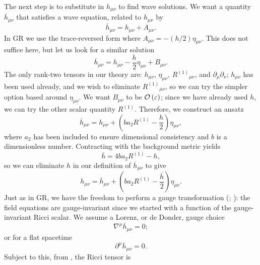 The next step is to substitute in $h_{\mu\nu}$ to find wave solutions. We want a quantity $\overline{h}_{\mu\nu}$ that satisfies a wave equation, related to $h_{\mu\nu}$ by
\begin{equation}
\overline{h}_{\mu\nu} = h_{\mu\nu} + A_{\mu\nu}.
\end{equation}
In GR we use the trace-reversed form where $A_{\mu\nu} = -(h/2)\eta_{\mu\nu}$. This does not suffice here, but let us look for a similar solution
\begin{equation}
\overline{h}_{\mu\nu} = h_{\mu\nu} - \dfrac{h}{2}\eta_{\mu\nu} + B_{\mu\nu}.
\end{equation}
The only rank-two tensors in our theory are: $h_{\mu\nu}$, $\eta_{\mu\nu}$, ${R^{(1)}}_{\mu\nu}$, and $\partial_\mu\partial_\nu$; $h_{\mu\nu}$ has been used already, and we wish to eliminate ${R^{(1)}}_{\mu\nu}$, so we can try the simpler option based around $\eta_{\mu\nu}$. We want $B_{\mu\nu}$ to be $\mathcal{O}\left({\varepsilon}\right)$; since we have already used $h$, we can try the other scalar quantity $R^{(1)}$. Therefore, we construct an ansatz
\begin{equation}
\overline{h}_{\mu\nu} = h_{\mu\nu} + \left(b a_2 R^{(1)} - \dfrac{h}{2}\right)\eta_{\mu\nu},
\label{eq:Ansatz}
\end{equation}
where $a_2$ has been included to ensure dimensional consistency and $b$ is a dimensionless number. Contracting with the background metric yields
\begin{equation}
\overline{h} = 4b a_2 R^{(1)} - h,
\label{eq:h_trace}
\end{equation}
so we can eliminate $h$ in our definition of $\overline{h}_{\mu\nu}$ to give
\begin{equation}
h_{\mu\nu} = \overline{h}_{\mu\nu} + \left(b a_2 R^{(1)} -\dfrac{\overline{h}}{2}\right)\eta_{\mu\nu}.
\end{equation}
Just as in GR, we have the freedom to perform a gauge transformation (\citealt[box 18.2]{Misner1973}; \citealt[section 17.1]{Hobson2006}): the field equations are gauge-invariant since we started with a function of the gauge-invariant Ricci scalar. We assume a Lorenz, or de Donder, gauge choice
\begin{equation}
\nabla^\mu \overline{h}_{\mu\nu} = 0;
\end{equation}
or for a flat spacetime
\begin{equation}
\partial^\mu \overline{h}_{\mu\nu} = 0.
\label{eq:Lorenz}
\end{equation}
Subject to this, from , the Ricci tensor is

